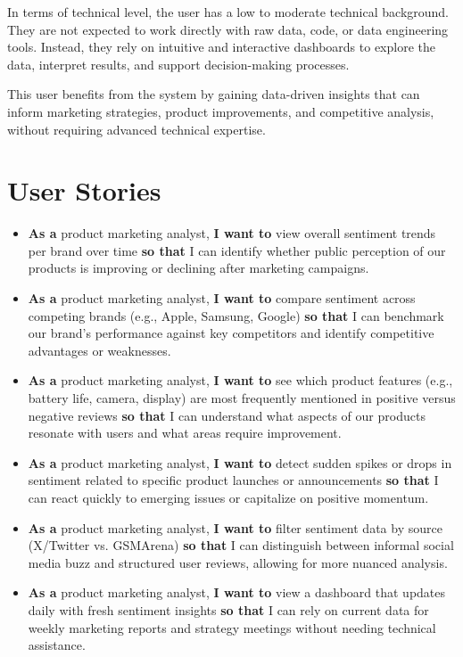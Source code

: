 \documentclass[12pt]{article}
\begin{document}
In terms of technical level, the user has a low to moderate technical background. They are not expected to work directly with raw data, code, or data engineering tools. Instead, they rely on intuitive and interactive dashboards to explore the data, interpret results, and support decision-making processes.

This user benefits from the system by gaining data-driven insights that can inform marketing strategies, product improvements, and competitive analysis, without requiring advanced technical expertise.

\section{User Stories}

\begin{itemize}
\item \textbf{As a} product marketing analyst, \textbf{I want to} view overall sentiment trends per brand over time \textbf{so that} I can identify whether public perception of our products is improving or declining after marketing campaigns.

\item \textbf{As a} product marketing analyst, \textbf{I want to} compare sentiment across competing brands (e.g., Apple, Samsung, Google) \textbf{so that} I can benchmark our brand’s performance against key competitors and identify competitive advantages or weaknesses.

\item \textbf{As a} product marketing analyst, \textbf{I want to} see which product features (e.g., battery life, camera, display) are most frequently mentioned in positive versus negative reviews \textbf{so that} I can understand what aspects of our products resonate with users and what areas require improvement.

\item \textbf{As a} product marketing analyst, \textbf{I want to} detect sudden spikes or drops in sentiment related to specific product launches or announcements \textbf{so that} I can react quickly to emerging issues or capitalize on positive momentum.

\item \textbf{As a} product marketing analyst, \textbf{I want to} filter sentiment data by source (X/Twitter vs. GSMArena) \textbf{so that} I can distinguish between informal social media buzz and structured user reviews, allowing for more nuanced analysis.

\item \textbf{As a} product marketing analyst, \textbf{I want to} view a dashboard that updates daily with fresh sentiment insights \textbf{so that} I can rely on current data for weekly marketing reports and strategy meetings without needing technical assistance.
\end{itemize}
\end{document}
